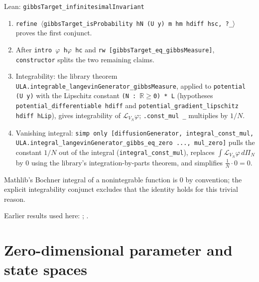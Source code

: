 \documentclass[11pt,a4paper]{report}
\begin{document}
\begin{leanbox}{Lean: \texttt{gibbsTarget\_\allowbreak{}infinitesimalInvariant}}
\begin{enumerate}


\item \texttt{refine \ensuremath{\langle}gibbs\allowbreak{}Target\_\allowbreak{}is\allowbreak{}Probability h\allowbreak{}N (U y) m hm hdiff hsc, ?\_\allowbreak{}\ensuremath{\rangle}} proves the first conjunct.

\item After \texttt{intro \ensuremath{\varphi} h\ensuremath{\varphi} hc} and \texttt{rw [gibbs\allowbreak{}Target\_\allowbreak{}eq\_\allowbreak{}gibbs\allowbreak{}Measure]}, \texttt{constructor} splits the two remaining claims.

\item Integrability: the library theorem \texttt{ULA.\allowbreak{}integrable\_\allowbreak{}langevin\allowbreak{}Generator\_\allowbreak{}gibbs\allowbreak{}Measure}, applied to \texttt{potential (U y)} with the Lipschitz constant \texttt{(N : \ensuremath{\mathbb R}\ensuremath{\ge}0) * L} (hypotheses \texttt{potential\_\allowbreak{}differentiable hdiff} and \texttt{potential\_\allowbreak{}gradient\_\allowbreak{}lipschitz hdiff h\allowbreak{}Lip}), gives integrability of \(\mathcal L_{V_N}\varphi\); \texttt{.\allowbreak{}const\_\allowbreak{}mul \_\allowbreak{}} multiplies by \(1/N\).

\item Vanishing integral: \texttt{simp only [diffusion\allowbreak{}Generator, integral\_\allowbreak{}const\_\allowbreak{}mul, ULA.\allowbreak{}integral\_\allowbreak{}langevin\allowbreak{}Generator\_\allowbreak{}gibbs\_\allowbreak{}eq\_\allowbreak{}zero .\allowbreak{}.\allowbreak{}.\allowbreak{}, mul\_\allowbreak{}zero]} pulls the constant \(1/N\) out of the integral (\texttt{integral\_\allowbreak{}const\_\allowbreak{}mul}), replaces \(\int\mathcal L_{V_N}\varphi\,d\Pi_N\) by \(0\) using the library's integration-by-parts theorem, and simplifies \(\frac1N\cdot0=0\).

\end{enumerate}



Mathlib's Bochner integral of a nonintegrable function is \(0\) by convention; the explicit integrability conjunct excludes that the identity holds for this trivial reason.
\end{leanbox}


Earlier results used here: \cite[Section~3.46.11]{LangevinLean2026ULASC}; \cite[Section~3.46.13]{LangevinLean2026ULASC}.
\section{\texorpdfstring{Zero-dimensional parameter and state spaces}{Zero-dimensional parameter and state spaces}}
\label{proof-module-IPLA-Degenerate-lean}
\end{document}
